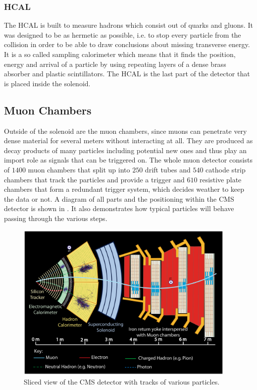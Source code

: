 \documentclass[british,11pt,a4paper]{memoir}
\begin{document}
\subsubsection{\ac{HCAL}}
The \ac{HCAL} is built to measure hadrons which consist out of quarks and gluons. It was designed to be as hermetic as possible, i.e. to stop every particle from the collision in order to be able to draw conclusions about missing transverse energy. It is a so called sampling calorimeter which means that it finds the position, energy and arrival of a particle by using repeating layers of a dense brass absorber and plastic scintillators. The \ac{HCAL} is the last part of the detector that is placed inside the solenoid.
\subsection{Muon Chambers}
Outside of the solenoid are the muon chambers, since muons can penetrate very dense material for several meters without interacting at all. They are produced as decay products of many particles including potential new ones and thus play an import role as signals that can be triggered on. The whole muon detector consists of $1400$ muon chambers that split up into $250$ drift tubes and $540$ cathode strip chambers that track the particles and provide a trigger and $610$ resistive plate chambers that form a redundant trigger system, which decides weather to keep the data or not.\as 
A diagram of all parts and the positioning within the \ac{CMS} detector is shown in . It also demonstrates how typical particles will behave passing through the various steps.
\begin{figure}[ht]
	\centering
	\includegraphics[width=0.95\textwidth]{cms_slice}
	\caption{Sliced view of the CMS detector with tracks of various particles.}
	\label{p20}
\end{figure}
\end{document}
